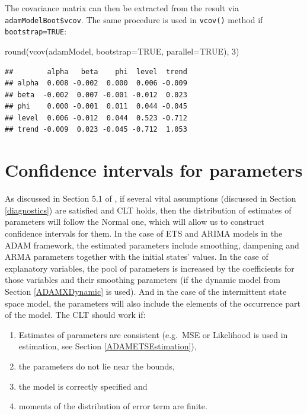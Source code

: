 \documentclass[
]{book}
\newenvironment{Shaded}{\begin{snugshade}}{\end{snugshade}}
\newcommand{\AttributeTok}[1]{\textcolor[rgb]{0.77,0.63,0.00}{#1}}
\newcommand{\ConstantTok}[1]{\textcolor[rgb]{0.00,0.00,0.00}{#1}}
\newcommand{\DecValTok}[1]{\textcolor[rgb]{0.00,0.00,0.81}{#1}}
\newcommand{\FunctionTok}[1]{\textcolor[rgb]{0.00,0.00,0.00}{#1}}
\newcommand{\NormalTok}[1]{#1}
\providecommand{\tightlist}{%
  \setlength{\itemsep}{0pt}\setlength{\parskip}{0pt}}
\theoremstyle{definition}
\theoremstyle{definition}
\theoremstyle{definition}
\theoremstyle{definition}
\theoremstyle{remark}
\begin{document}
The covariance matrix can then be extracted from the result via \texttt{adamModelBoot\$vcov}. The same procedure is used in \texttt{vcov()} method if \texttt{bootstrap=TRUE}:

\begin{Shaded}
\begin{Highlighting}[]
\FunctionTok{round}\NormalTok{(}\FunctionTok{vcov}\NormalTok{(adamModel, }\AttributeTok{bootstrap=}\ConstantTok{TRUE}\NormalTok{, }\AttributeTok{parallel=}\ConstantTok{TRUE}\NormalTok{), }\DecValTok{3}\NormalTok{)}
\end{Highlighting}
\end{Shaded}

\begin{verbatim}
##        alpha   beta    phi  level  trend
## alpha  0.008 -0.002  0.000  0.006 -0.009
## beta  -0.002  0.007 -0.001 -0.012  0.023
## phi    0.000 -0.001  0.011  0.044 -0.045
## level  0.006 -0.012  0.044  0.523 -0.712
## trend -0.009  0.023 -0.045 -0.712  1.053
\end{verbatim}

\hypertarget{confidence-intervals-for-parameters}{%
\section{Confidence intervals for parameters}\label{confidence-intervals-for-parameters}}

As discussed in Section 5.1 of \citet{SvetunkovSBA}, if several vital assumptions (discussed in Section \ref{diagnostics}) are satisfied and CLT holds, then the distribution of estimates of parameters will follow the Normal one, which will allow us to construct confidence intervals for them. In the case of ETS and ARIMA models in the ADAM framework, the estimated parameters include smoothing, dampening and ARMA parameters together with the initial states' values. In the case of explanatory variables, the pool of parameters is increased by the coefficients for those variables and their smoothing parameters (if the dynamic model from Section \ref{ADAMXDynamic} is used). And in the case of the intermittent state space model, the parameters will also include the elements of the occurrence part of the model. The CLT should work if:

\begin{enumerate}
\def\labelenumi{\arabic{enumi}.}
\tightlist
\item
  Estimates of parameters are consistent (e.g.~MSE or Likelihood is used in estimation, see Section \ref{ADAMETSEstimation}),
\item
  the parameters do not lie near the bounds,
\item
  the model is correctly specified and
\item
  moments of the distribution of error term are finite.
\end{enumerate}
\end{document}
